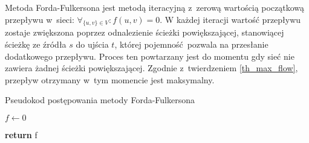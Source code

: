 \par{
  Metoda Forda-Fulkersona jest metodą iteracyjną z~zerową wartością początkową przepływu w~sieci: $\forall_{\{u,v\}\in V}: f(u,v)=0$.
  W każdej iteracji wartość przepływu zostaje zwiększona poprzez odnalezienie ścieżki powiększającej, stanowiącej ścieżkę ze źródła $s$ do ujścia $t$, której pojemność pozwala na przesłanie dodatkowego przepływu.
  Proces ten powtarzany jest do momentu gdy sieć nie zawiera żadnej ścieżki powiększającej.
  Zgodnie z~twierdzeniem \ref{th_max_flow}, przepływ otrzymany w~tym momencie jest maksymalny.
  \begin{algorithm}
    \caption{Pseudokod postępowania metody Forda-Fulkersona}\label{alg_fordFulkerson}
    \begin{algorithmic}[1]



        \State $f \gets 0$

        \EndWhile
        \State\textbf{return} f
      \EndFunction
  \end{algorithmic}
  \end{algorithm}
}
